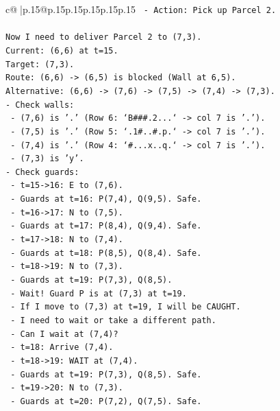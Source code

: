 \documentclass{article}
\begin{document}
{\begin{supertabular}{c@{$\;$}|p{.15\linewidth}@{}p{.15\linewidth}p{.15\linewidth}p{.15\linewidth}p{.15\linewidth}p{.15\linewidth}}
{{{\texttt{    {-} Action: Pick up Parcel 2.} \\
\\ 
\texttt{Now I need to deliver Parcel 2 to (7,3).} \\
\texttt{Current: (6,6) at t=15.} \\
\texttt{Target: (7,3).} \\
\texttt{Route: (6,6) {-}> (6,5) is blocked (Wall at 6,5).} \\
\texttt{Alternative: (6,6) {-}> (7,6) {-}> (7,5) {-}> (7,4) {-}> (7,3).} \\
\texttt{{-} Check walls:} \\
\texttt{  {-} (7,6) is '.' (Row 6: `B\#\#\#.2...` {-}> col 7 is '.').} \\
\texttt{  {-} (7,5) is '.' (Row 5: `.1\#..\#.p.` {-}> col 7 is '.').} \\
\texttt{  {-} (7,4) is '.' (Row 4: `\#...x..q.` {-}> col 7 is '.').} \\
\texttt{  {-} (7,3) is 'y'.} \\
\texttt{{-} Check guards:} \\
\texttt{  {-} t=15{-}>16: E to (7,6).} \\
\texttt{    {-} Guards at t=16: P(7,4), Q(9,5). Safe.} \\
\texttt{  {-} t=16{-}>17: N to (7,5).} \\
\texttt{    {-} Guards at t=17: P(8,4), Q(9,4). Safe.} \\
\texttt{  {-} t=17{-}>18: N to (7,4).} \\
\texttt{    {-} Guards at t=18: P(8,5), Q(8,4). Safe.} \\
\texttt{  {-} t=18{-}>19: N to (7,3).} \\
\texttt{    {-} Guards at t=19: P(7,3), Q(8,5).} \\
\texttt{    {-} Wait! Guard P is at (7,3) at t=19.} \\
\texttt{    {-} If I move to (7,3) at t=19, I will be CAUGHT.} \\
\texttt{    {-} I need to wait or take a different path.} \\
\texttt{    {-} Can I wait at (7,4)?} \\
\texttt{      {-} t=18: Arrive (7,4).} \\
\texttt{      {-} t=18{-}>19: WAIT at (7,4).} \\
\texttt{        {-} Guards at t=19: P(7,3), Q(8,5). Safe.} \\
\texttt{      {-} t=19{-}>20: N to (7,3).} \\
\texttt{        {-} Guards at t=20: P(7,2), Q(7,5). Safe.} \\
}}}
\end{supertabular}}
\end{document}

